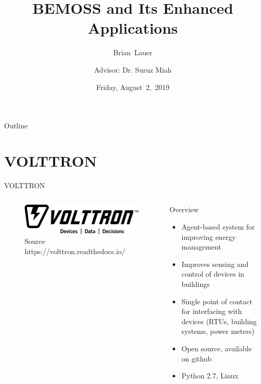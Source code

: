 \documentclass{beamer}
\title[Progress]{BEMOSS and Its Enhanced Applications}
\author[B.~Lauer]{Brian~Lauer \\\and
Advisor: Dr. Suruz Miah}
\institute[Bradley University] %
{
  Department of Electrical and Computer Engineering\\
  Bradley University\\
  1501 W. Bradley Avenue\\
  Peoria, IL, 61625, USA
}
\date[August~2,~2019]{Friday, August~2,~2019}
\begin{document}
\begin{frame}
  \titlepage
\end{frame}

\begin{frame}{Outline}
  \tableofcontents
\end{frame}

\section{VOLTTRON}

\begin{frame}{VOLTTRON}
	\begin{columns}
		\begin{column}{0.5\textwidth}
		\begin{figure}
			\centering
			\includegraphics[scale=0.15]{../figs/volttronlogo.png}
			\caption{Source https://volttron.readthedocs.io/}
		\end{figure}
		\end{column}
		\begin{column}{0.5\textwidth}
			\begin{block}{Overview}
			\begin{itemize}
			\item Agent-based system for improving energy management
			\item Improves sensing and control of devices in buildings
			\item Single point of contact for interfacing with devices (RTUs, building systems, power meters)
			\item Open source, available on github
			\item Python 2.7, Linux
			\end{itemize}
			\end{block}
		\end{column}
	\end{columns}
\end{frame}
\end{document}
